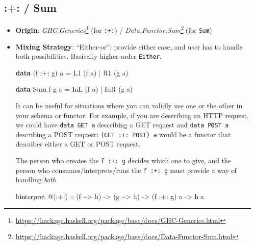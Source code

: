 \documentclass[]{article}
\newenvironment{Shaded}{}{}
\newcommand{\DataTypeTok}[1]{\textcolor[rgb]{0.56,0.13,0.00}{#1}}
\newcommand{\KeywordTok}[1]{\textcolor[rgb]{0.00,0.44,0.13}{\textbf{#1}}}
\newcommand{\NormalTok}[1]{#1}
\newcommand{\OperatorTok}[1]{\textcolor[rgb]{0.40,0.40,0.40}{#1}}
\newcommand{\OtherTok}[1]{\textcolor[rgb]{0.00,0.44,0.13}{#1}}
\renewcommand{\href}[2]{#2\footnote{\url{#1}}}
\begin{document}
\hypertarget{sum}{%
\subsection{:+: / Sum}\label{sum}}

\begin{itemize}
\item
  \textbf{Origin}:
  \emph{\href{https://hackage.haskell.org/package/base/docs/GHC-Generics.html}{GHC.Generics}}
  (for \texttt{:+:}) /
  \emph{\href{https://hackage.haskell.org/package/base/docs/Data-Functor-Sum.html}{Data.Functor.Sum}}
  (for \texttt{Sum})
\item
  \textbf{Mixing Strategy}: ``Either-or'': provide either case, and user has to
  handle both possibilities. Basically higher-order \texttt{Either}.

\begin{Shaded}
\begin{Highlighting}[]
\KeywordTok{data}\NormalTok{ (f }\OperatorTok{:+:}\NormalTok{ g) a}
    \OtherTok{=} \DataTypeTok{L1}\NormalTok{ (f a)}
    \OperatorTok{|} \DataTypeTok{R1}\NormalTok{ (g a)}

\KeywordTok{data} \DataTypeTok{Sum}\NormalTok{ f g a}
    \OtherTok{=} \DataTypeTok{InL}\NormalTok{ (f a)}
    \OperatorTok{|} \DataTypeTok{InR}\NormalTok{ (g a)}
\end{Highlighting}
\end{Shaded}

  It can be useful for situations where you can validly use one or the other in
  your schema or functor. For example, if you are describing an HTTP request, we
  could have \texttt{data\ GET\ a} describing a GET request and
  \texttt{data\ POST\ a} describing a POST request; \texttt{(GET\ :+:\ POST)\ a}
  would be a functor that describes either a GET or POST request.

  The person who creates the \texttt{f\ :+:\ g} decides which one to give, and
  the person who consumes/interprets/runs the \texttt{f\ :+:\ g} must provide a
  way of handling \emph{both}

\begin{Shaded}
\begin{Highlighting}[]
\NormalTok{binterpret }\OperatorTok{@}\NormalTok{(}\OperatorTok{:+:}\NormalTok{)}
\OtherTok{    ::}\NormalTok{ (f }\OperatorTok{\textasciitilde{}>}\NormalTok{ h)}
    \OtherTok{{-}>}\NormalTok{ (g }\OperatorTok{\textasciitilde{}>}\NormalTok{ h)}
    \OtherTok{{-}>}\NormalTok{ (f }\OperatorTok{:+:}\NormalTok{ g) a}
    \OtherTok{{-}>}\NormalTok{ h a}
\end{Highlighting}
\end{Shaded}


\end{itemize}
\end{document}
